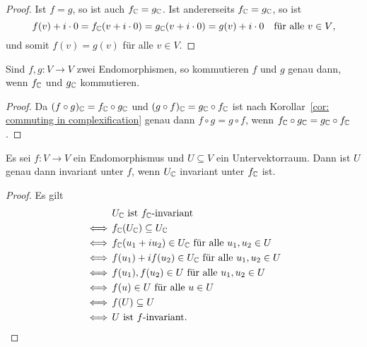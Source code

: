 \documentclass[a4paper,10pt,numbers=noenddot]{scrartcl}
\begin{document}
\begin{proof}
  Ist $f = g$, so ist auch $f_{\mathbb{C}} = g_{\mathbb{C}}$.
  Ist andererseits $f_{\mathbb{C}} = g_{\mathbb{C}}$, so ist
  \[
    f(v) + i \cdot 0
    = f_{\mathbb{C}}(v + i \cdot 0)
    = g_{\mathbb{C}}(v + i \cdot 0)
    = g(v) + i \cdot 0
    \quad
    \text{für alle $v \in V$},
  \]
  und somit $f(v) = g(v)$ für alle $v \in V$.
\end{proof}


\begin{corollary}\label{cor: commuting in complexification}
  Sind $f, g \colon V \to V$ zwei Endomorphismen, so kommutieren $f$ und $g$ genau dann, wenn $f_{\mathbb{C}}$ und $g_{\mathbb{C}}$ kommutieren.
\end{corollary}


\begin{proof}
  Da $(f \circ g)_{\mathbb{C}} = f_{\mathbb{C}} \circ g_{\mathbb{C}}$ und $(g \circ f)_{\mathbb{C}} = g_{\mathbb{C}} \circ f_{\mathbb{C}}$ ist nach Korollar~\ref{cor: commuting in complexification} genau dann $f \circ g = g \circ f$, wenn $f_{\mathbb{C}} \circ g_{\mathbb{C}} = g_{\mathbb{C}} \circ f_{\mathbb{C}}$.
\end{proof}


\begin{lemma}\label{lem: invariance of induced subspaces}
  Es sei $f \colon V \to V$ ein Endomorphismus und $U \subseteq V$ ein Untervektorraum.
  Dann ist $U$ genau dann invariant unter $f$, wenn $U_{\mathbb{C}}$ invariant unter $f_{\mathbb{C}}$ ist.
\end{lemma}


\begin{proof}
  Es gilt
  \begin{align*}
        &\, \text{$U_{\mathbb{C}}$ ist $f_{\mathbb{C}}$-invariant}                            \\
    \iff&\, f_{\mathbb{C}}(U_{\mathbb{C}}) \subseteq U_{\mathbb{C}}                                   \\
    \iff&\, \text{$f_{\mathbb{C}}(u_1 + i u_2) \in U_{\mathbb{C}}$ für alle $u_1, u_2 \in U$} \\
    \iff&\, \text{$f(u_1) + i f(u_2) \in U_{\mathbb{C}}$ für alle $u_1, u_2 \in U$}   \\
    \iff&\, \text{$f(u_1), f(u_2) \in U$ für alle $u_1, u_2 \in U$}           \\
    \iff&\, \text{$f(u) \in U$ für alle $u \in U$}                            \\
    \iff&\, f(U) \subseteq U                                                  \\
    \iff&\, \text{$U$ ist $f$-invariant}.
    \qedhere
  \end{align*}
\end{proof}
\end{document}
